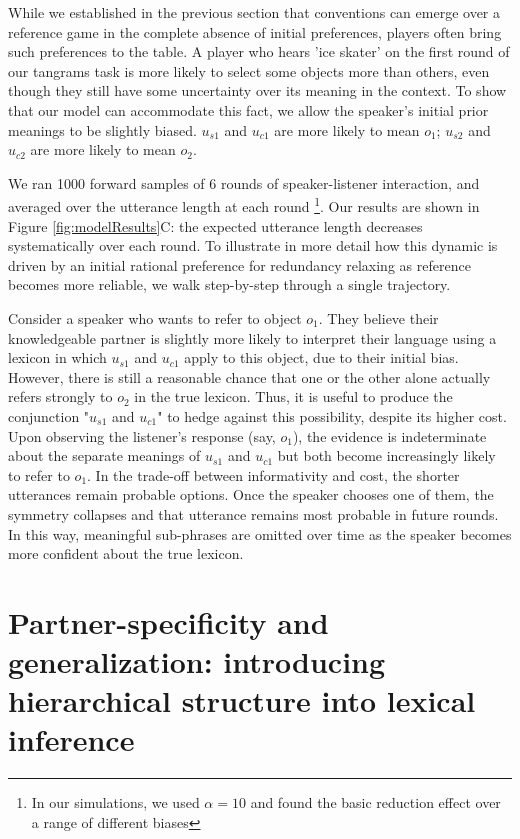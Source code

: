 While we established in the previous section that conventions can emerge over a reference game in the complete absence of initial preferences, players often bring such preferences to the table. A player who hears 'ice skater' on the first round of our tangrams task is more likely to select some objects more than others, even though they still have some uncertainty over its meaning in the context. To show that our model can accommodate this fact, we allow the speaker's initial prior meanings to be slightly biased. $u_{s1}$ and $u_{c1}$ are more likely to mean $o_1$; $u_{s2}$ and $u_{c2}$ are more likely to mean $o_2$.

We ran 1000 forward samples of 6 rounds of speaker-listener interaction, and averaged over the utterance length at each round \footnote{In our simulations, we used $\alpha = 10$ and found the basic reduction effect over a range of different biases}. Our results are shown in Figure \ref{fig:modelResults}C: the expected utterance length decreases systematically over each round. To illustrate in more detail how this dynamic is driven by an initial rational preference for redundancy relaxing as reference becomes more reliable, we walk step-by-step through a single trajectory. 

Consider a speaker who wants to refer to object $o_1$. They believe their knowledgeable partner is slightly more likely to interpret their language using a lexicon in which $u_{s1}$ and $u_{c1}$ apply to this object, due to their initial bias. However, there is still a reasonable chance that one or the other alone actually refers strongly to $o_2$ in the true lexicon. Thus, it is useful to produce the conjunction "$u_{s1}$ and $u_{c1}$" to hedge against this possibility, despite its higher cost. Upon observing the listener's response (say, $o_1$), the evidence is indeterminate about the separate meanings of $u_{s1}$ and $u_{c1}$ but both become increasingly likely to refer to $o_1$. In the trade-off between informativity and cost, the shorter utterances remain probable options. Once the speaker chooses one of them, the symmetry collapses and that utterance remains most probable in future rounds. In this way, meaningful sub-phrases are omitted over time as the speaker becomes more confident about the true lexicon. 

\section{Partner-specificity and generalization: introducing hierarchical structure into lexical inference}

